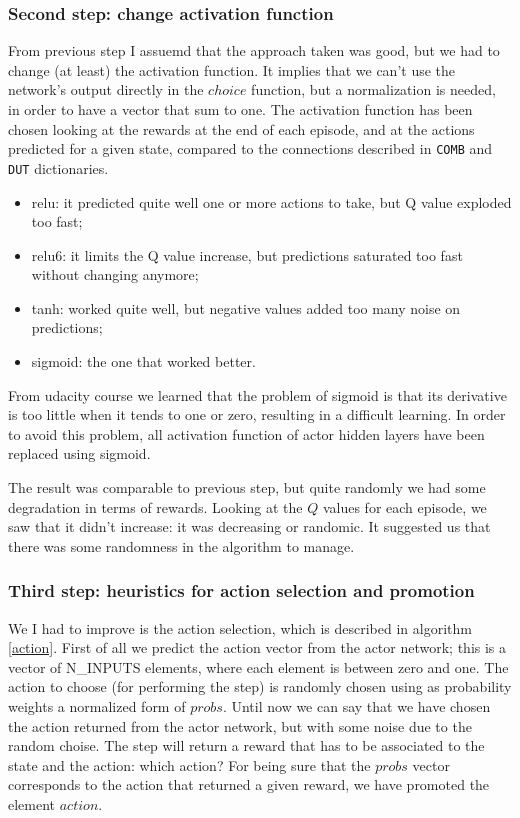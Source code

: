 \documentclass{article}
\begin{document}
\subsubsection*{Second step: change activation function}
From previous step I assuemd that the approach taken was good, but we had to change (at least) the activation function. It implies that we can't use the network's output directly in the $choice$ function, but a normalization is needed, in order to have a vector that sum to one. The activation function has been chosen looking at the rewards at the end of each episode, and at the actions predicted for a given state, compared to the connections described in \texttt{COMB} and \texttt{DUT} dictionaries.
\begin{itemize}
\item relu: it predicted quite well one or more actions to take, but Q value exploded too fast;
\item relu6: it limits the Q value increase, but predictions saturated too fast without changing anymore;
\item tanh: worked quite well, but negative values added too many noise on predictions;
\item sigmoid: the one that worked better.
\end{itemize}
From udacity course we learned that the problem of sigmoid is that its derivative is too little when it tends to one or zero, resulting in a difficult learning. In order to avoid this problem, all activation function of actor hidden layers have been replaced using sigmoid.

The result was comparable to previous step, but quite randomly we had some degradation in terms of rewards. Looking at the $Q$ values for each episode, we saw that it didn't increase: it was decreasing or randomic. It suggested us that there was some randomness in the algorithm to manage.

\subsubsection*{Third step: heuristics for action selection and promotion}
We I had to improve is the action selection, which is described in algorithm \ref{action}. First of all we predict the action vector from the actor network; this is a vector of N\_INPUTS elements, where each element is between zero and one. The action to choose (for performing the step) is randomly chosen using as probability weights a normalized form of $probs$. Until now we can say that we have chosen the action returned from the actor network, but with some noise due to the random choise. The step will return a reward that has to be associated to the state and the action: which action? For being sure that the $probs$ vector corresponds to the action that returned a given reward, we have promoted the element $action$.
\end{document}
